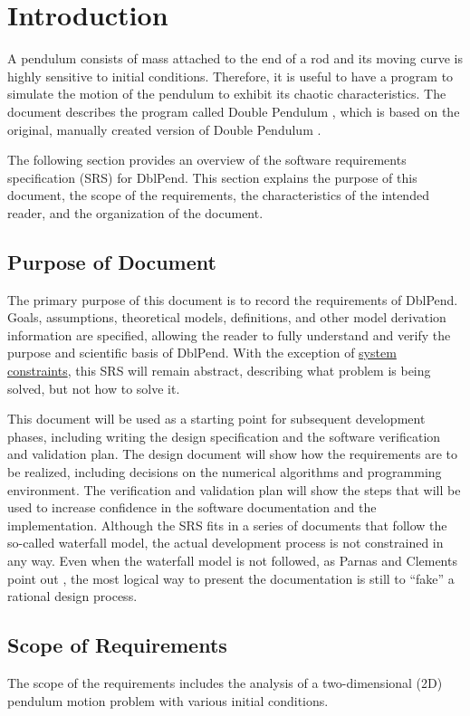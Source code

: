 \documentclass[12pt]{article}
\begin{document}
\section{Introduction}
\label{Sec:Intro}
A pendulum consists of mass attached to the end of a rod and its moving curve is highly sensitive to initial conditions. Therefore, it is useful to have a program to simulate the motion of the pendulum to exhibit its chaotic characteristics. The document describes the program called Double Pendulum , which is based on the original, manually created version of Double Pendulum \cite{dblPendOriginal}.

The following section provides an overview of the software requirements specification (SRS) for DblPend. This section explains the purpose of this document, the scope of the requirements, the characteristics of the intended reader, and the organization of the document.

\subsection{Purpose of Document}
\label{Sec:DocPurpose}
The primary purpose of this document is to record the requirements of DblPend. Goals, assumptions, theoretical models, definitions, and other model derivation information are specified, allowing the reader to fully understand and verify the purpose and scientific basis of DblPend. With the exception of \hyperref[Sec:SysConstraints]{system constraints}, this SRS will remain abstract, describing what problem is being solved, but not how to solve it.

This document will be used as a starting point for subsequent development phases, including writing the design specification and the software verification and validation plan. The design document will show how the requirements are to be realized, including decisions on the numerical algorithms and programming environment. The verification and validation plan will show the steps that will be used to increase confidence in the software documentation and the implementation. Although the SRS fits in a series of documents that follow the so-called waterfall model, the actual development process is not constrained in any way. Even when the waterfall model is not followed, as Parnas and Clements point out \cite{parnasClements1986}, the most logical way to present the documentation is still to ``fake'' a rational design process.

\subsection{Scope of Requirements}
\label{Sec:ReqsScope}
The scope of the requirements includes the analysis of a two-dimensional (2D) pendulum motion problem with various initial conditions.
\end{document}

